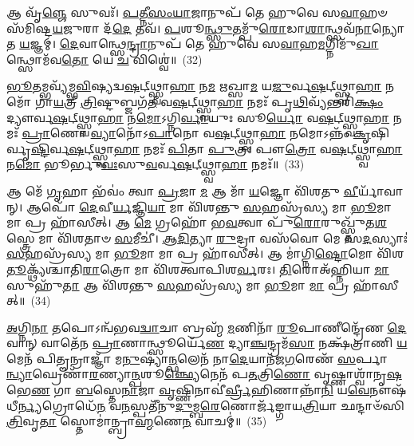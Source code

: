 𑌆 𑌵𑍃᳴\-\ul{𑌞𑍍𑌜𑍇} 𑌸𑍁𑌵𑌃᳴। \ul{𑌪}\-\-\ul{𑌤𑍍𑌨𑍀}\-\-\ul{𑌸𑌂}\-\-\ul{𑌯𑌾}\-𑌜𑌾𑌨𑍁𑌪᳴ 𑌤𑍇 𑌹𑍁𑌵𑍇 𑌸\-\ul{𑌵𑌾}\-𑌹𑍞 𑌸᳴𑌮𑌿𑌷𑍍𑌟\-\ul{𑌯}\-𑌜𑍁𑌰𑌾 𑌦᳴\-\ul{𑌦𑍇} 𑌤𑌵᳴। \ul{𑌪}\-𑌶𑍂\-\ul{𑌨𑍍𑌥𑍍𑌸𑍁}\-𑌤𑌮𑍍𑌪𑍁᳴\-\ul{𑌰𑍋}\-𑌡𑌾\-\ul{𑌶𑌾}\-𑌨𑍍𑌥𑍍𑌸𑌵᳴\-\ul{𑌨𑌾}\-𑌨𑍍𑌯𑍋𑌤 \ul{𑌯}\-𑌜𑍍𑌞𑌮𑍍। \ul{𑌦𑍇}\-𑌵𑌾𑌨𑍍𑌥𑍍𑌸𑍇\-\ul{𑌨𑍍𑌦𑍍𑌰𑌾}\-𑌨𑍁𑌪᳴ 𑌤𑍇 𑌹𑍁𑌵𑍇 𑌸\-\ul{𑌵𑌾}\-𑌹\-\ul{𑌮}\-𑌗𑍍𑌨𑌿𑌮𑍁᳴\-\ul{𑌖𑌾}\-𑌨𑍍𑌥𑍍𑌸𑍋𑌮᳴𑌵\-\ul{𑌤𑍋} 𑌯𑍇 \ul{𑌚} 𑌵𑌿𑌶𑍍𑌵𑍇॑॥~(32)

{\anuvakamend[{𑌉\-\ul{𑌪} 𑌗𑍍𑌰\-\ul{𑌹}\-𑌮𑌿𑌡𑌾᳴\-\ul{𑌮𑌾}\-𑌶𑌿\-\ul{𑌷𑍋} 𑌦𑍍𑌵𑌾𑌤𑍍𑌰𑌿𑍞᳴𑌶𑌚𑍍𑌚}]}%

\-\ul{𑌭𑍂}\-𑌤𑌮𑍍𑌭𑌵𑍍𑌯᳴𑌮𑍍𑌭\-\ul{𑌵𑌿}\-𑌷𑍍𑌯𑌦𑍍𑌵\-\ul{𑌷}\-𑌟𑍍𑌥𑍍𑌸𑍍𑌵𑌾\-\ul{𑌹𑌾} 𑌨\-\ul{𑌮} 𑌋𑌖𑍍𑌸𑌾\-\ul{𑌮} 𑌯\-\ul{𑌜𑍁}\-𑌰𑍍𑌵\-\ul{𑌷}\-𑌟𑍍𑌥𑍍𑌸𑍍𑌵𑌾\-\ul{𑌹𑌾} 𑌨𑌮𑍋᳴ 𑌗𑌾\-\ul{𑌯}\-𑌤𑍍𑌰𑍀 \ul{𑌤𑍍𑌰𑌿}\-𑌷𑍍𑌟𑍁𑌬𑍍𑌜𑌗᳴\-\ul{𑌤𑍀} 𑌵\-\ul{𑌷}\-𑌟𑍍𑌥𑍍𑌸𑍍𑌵𑌾\-\ul{𑌹𑌾} 𑌨𑌮𑌃᳴ 𑌪𑍃\-\ul{𑌥𑌿}\-𑌵𑍍𑌯᳴𑌨𑍍𑌤𑌰𑌿᳴\-\ul{𑌕𑍍𑌷𑌂} 𑌦𑍍𑌯𑍗𑌰𑍍𑌵\-\ul{𑌷}\-𑌟𑍍𑌥𑍍𑌸𑍍𑌵𑌾\-\ul{𑌹𑌾} 𑌨\-\ul{𑌮𑍋}\-\-𑌽𑌗𑍍𑌨𑌿\-\ul{𑌰𑍍𑌵𑌾}\-𑌯𑍁𑌃 𑌸𑍂\-\ul{𑌰𑍍𑌯𑍋} 𑌵\-\ul{𑌷}\-𑌟𑍍𑌥𑍍𑌸𑍍𑌵𑌾\-\ul{𑌹𑌾} 𑌨𑌮𑌃᳴ \ul{𑌪𑍍𑌰𑌾}\-𑌣𑍋 \ul{𑌵𑍍𑌯𑌾}\-𑌨𑍋᳴\-𑌽\-\ul{𑌪𑌾}\-𑌨𑍋 𑌵\-\ul{𑌷}\-𑌟𑍍𑌥𑍍𑌸𑍍𑌵𑌾\-\ul{𑌹𑌾} 𑌨𑌮𑍋\-𑌽𑌨𑍍𑌨𑌂᳴ \ul{𑌕𑍃}\-𑌷𑌿𑌰𑍍𑌵𑍃\-\ul{𑌷𑍍𑌟𑌿}\-𑌰𑍍𑌵\-\ul{𑌷}\-𑌟𑍍𑌥𑍍𑌸𑍍𑌵𑌾\-\ul{𑌹𑌾} 𑌨𑌮𑌃᳴ \ul{𑌪𑌿}\-𑌤𑌾 \ul{𑌪𑍁}\-𑌤𑍍𑌰𑌃 𑌪𑍗\-\ul{𑌤𑍍𑌰𑍋} 𑌵\-\ul{𑌷}\-𑌟𑍍𑌥𑍍𑌸𑍍𑌵𑌾\-\ul{𑌹𑌾} 𑌨\-\ul{𑌮𑍋} 𑌭𑍂𑌰𑍍𑌭𑍁\-\ul{𑌵𑌃}\-𑌸𑍁\-\ul{𑌵}\-𑌰𑍍𑌵\-\ul{𑌷}\-𑌟𑍍𑌥𑍍𑌸𑍍𑌵𑌾\-\ul{𑌹𑌾} 𑌨𑌮𑌃᳴॥~(33)

{\anuvakamend[{𑌭𑍁𑌵᳴\-\ul{𑌶𑍍𑌚}\-𑌤𑍍𑌵𑌾𑌰𑌿᳴ 𑌚}]}%

𑌆 𑌮𑍇᳴ \ul{𑌗𑍃}\-𑌹𑌾 𑌭᳴𑌵𑌂॑ 𑌤𑍍𑌵𑌾 \ul{𑌪𑍍𑌰}\-𑌜𑌾 \ul{𑌮} 𑌆 𑌮𑌾᳴ \ul{𑌯}\-𑌜𑍍𑌞𑍋 𑌵𑌿᳴𑌶𑌤𑍁 \ul{𑌵𑍀}\-𑌰𑍍𑌯𑌾᳴𑌵𑌾𑌨𑍍। 𑌆𑌪𑍋᳴ \ul{𑌦𑍇}\-𑌵𑍀\-\ul{𑌰𑍍𑌯}\-𑌜𑍍𑌞𑌿\-\ul{𑌯𑌾} 𑌮𑌾 𑌵𑌿᳴𑌶𑌨𑍍𑌤𑍁 \ul{𑌸}\-𑌹𑌸𑍍𑌰᳴𑌸𑍍𑌯 𑌮𑌾 \ul{𑌭𑍂}\-𑌮𑌾 𑌮𑌾 𑌪𑍍𑌰 𑌹𑌾᳴𑌸𑍀𑌤𑍍। 𑌆 \ul{𑌮𑍇} 𑌗𑍍𑌰𑌹𑍋᳴ 𑌭\-\ul{𑌵}\-𑌤𑍍𑌵𑌾 𑌪𑍁᳴\-\ul{𑌰𑍋}\-𑌰𑍁𑌖𑍍𑌸𑍍𑌤𑍁᳴𑌤\-\ul{𑌶}\-𑌸𑍍𑌤𑍍𑌰𑍇 𑌮𑌾 𑌵𑌿᳴𑌶𑌤𑌾𑍞 \ul{𑌸}\-𑌮𑍀𑌚𑍀॑। \ul{𑌆}\-\-\ul{𑌦𑌿}\-𑌤𑍍𑌯𑌾 \ul{𑌰𑍁}\-𑌦𑍍𑌰𑌾 𑌵𑌸᳴𑌵𑍋 𑌮𑍇 𑌸\-\ul{𑌦}\-𑌸𑍍𑌯𑌾𑌃॑ \ul{𑌸}\-𑌹𑌸𑍍𑌰᳴𑌸𑍍𑌯 𑌮𑌾 \ul{𑌭𑍂}\-𑌮𑌾 𑌮𑌾 𑌪𑍍𑌰 𑌹𑌾᳴𑌸𑍀𑌤𑍍। 𑌆 𑌮𑌾॑𑌗𑍍𑌨𑌿\-\ul{𑌷𑍍𑌟𑍋}\-𑌮𑍋 𑌵𑌿᳴𑌶\-\ul{𑌤𑍂}\-𑌕𑍍𑌥𑍍𑌯᳴𑌶𑍍𑌚𑌾𑌤𑌿\-\ul{𑌰𑌾}\-𑌤𑍍𑌰𑍋 𑌮𑌾 𑌵𑌿᳴𑌶𑌤𑍍𑌵𑌾𑌪𑌿𑌶\-\ul{𑌰𑍍𑌵}\-𑌰𑌃। \ul{𑌤𑌿}\-𑌰𑍋𑌅᳴𑌹𑍍𑌨𑌿𑌯𑌾 \ul{𑌮𑌾} 𑌸𑍁𑌹𑍁᳴\-\ul{𑌤𑌾} 𑌆 𑌵𑌿᳴𑌶𑌨𑍍𑌤𑍁 \ul{𑌸}\-𑌹𑌸𑍍𑌰᳴𑌸𑍍𑌯 𑌮𑌾 \ul{𑌭𑍂}\-𑌮𑌾 \ul{𑌮𑌾} 𑌪𑍍𑌰 𑌹𑌾᳴𑌸𑍀𑌤𑍍॥~(34)

{\anuvakamend[{\-\ul{𑌅}\-\-\ul{𑌗𑍍𑌨𑌿}\-\-\ul{𑌷𑍍𑌟𑍋}\-𑌮𑍋 𑌵𑌿᳴𑌶\-\ul{𑌤𑍍𑌵}\-𑌷𑍍𑌟𑌾𑌦᳴𑌶 𑌚}]}%

\-\ul{𑌅}\-𑌗𑍍𑌨𑌿\-\ul{𑌨𑌾} 𑌤𑌪𑍋\-𑌽𑌨𑍍𑌵᳴𑌭𑌵\-\ul{𑌦𑍍𑌵𑌾}\-𑌚𑌾 𑌬𑍍𑌰𑌹𑍍𑌮᳴ \ul{𑌮}\-𑌣𑌿𑌨𑌾᳴ \ul{𑌰𑍂}\-𑌪𑌾𑌣𑍀𑌨𑍍𑌦𑍍𑌰𑍇᳴𑌣 \ul{𑌦𑍇}\-𑌵𑌾𑌨𑍍 𑌵𑌾𑌤𑍇᳴𑌨 \ul{𑌪𑍍𑌰𑌾}\-𑌣𑌾𑌨𑍍𑌥𑍍𑌸𑍂𑌰𑍍𑌯𑍇᳴\-\ul{𑌣} 𑌦𑍍𑌯𑌾\-\ul{𑌞𑍍𑌚}\-𑌨𑍍𑌦𑍍𑌰𑌮᳴\-\ul{𑌸𑌾} 𑌨𑌕𑍍𑌷᳴𑌤𑍍𑌰𑌾𑌣𑌿 \ul{𑌯}\-𑌮𑍇𑌨᳴ 𑌪𑌿𑌤𑍄𑌨𑍍𑌰𑌾𑌜𑍍𑌞𑌾᳴ 𑌮\-\ul{𑌨𑍁}\-𑌷𑍍𑌯𑌾॑\-\ul{𑌨𑍍𑌫}\-𑌲𑍇𑌨᳴ 𑌨𑌾\-\ul{𑌦𑍇}\-𑌯𑌾𑌨᳴𑌜\-\ul{𑌗}\-𑌰𑍇𑌣᳴ \ul{𑌸}\-𑌰𑍍𑌪𑌾\-\ul{𑌨𑍍𑌵𑍍𑌯𑌾}\-𑌘𑍍𑌰𑍇𑌣𑌾᳴\-\ul{𑌰}\-𑌣𑍍𑌯𑌾\-\ul{𑌨𑍍𑌪}\-𑌶𑍂\-\ul{𑌞𑍍𑌛𑍍𑌯𑍇}\-𑌨𑍇𑌨᳴ 𑌪\-\ul{𑌤}\-𑌤𑍍𑌰𑌿\-\ul{𑌣𑍋} 𑌵𑍃𑌷𑍍𑌣𑌾𑌶𑍍𑌵𑌾᳴𑌨𑍃\-\ul{𑌷}\-𑌭𑍇\-\ul{𑌣} 𑌗𑌾 \ul{𑌬}\-𑌸𑍍𑌤𑍇\-\ul{𑌨𑌾}\-𑌜𑌾 \ul{𑌵𑍃}\-𑌷𑍍𑌣𑌿𑌨𑌾𑌵𑍀॑\-\ul{𑌰𑍍𑌵𑍍𑌰𑍀}\-𑌹𑌿𑌣𑌾𑌨𑍍𑌨𑌾᳴\-\ul{𑌨𑌿} 𑌯\-\ul{𑌵𑍇}\-𑌨𑍗𑌷᳴𑌧𑍀\-\ul{𑌰𑍍𑌨𑍍𑌯}\-𑌗𑍍𑌰𑍋𑌧𑍇᳴\-\ul{𑌨} 𑌵\-\ul{𑌨}\-𑌸𑍍𑌪𑌤𑍀᳴𑌨𑍁\-\ul{𑌦𑍁}\-𑌮𑍍𑌬\-\ul{𑌰𑍇}\-𑌣𑍋𑌰𑍍𑌜᳴𑌙𑍍𑌗𑌾𑌯\-\ul{𑌤𑍍𑌰𑌿}\-𑌯𑌾 𑌛𑌨𑍍𑌦𑌾𑍞᳴𑌸𑌿 \ul{𑌤𑍍𑌰𑌿}\-𑌵𑍃\-\ul{𑌤𑌾} 𑌸𑍍𑌤𑍋𑌮𑌾॑𑌨𑍍𑌬𑍍𑌰𑌾\-\ul{𑌹𑍍𑌮}\-𑌣𑍇\-\ul{𑌨} 𑌵𑌾𑌚𑌮𑍍॑॥~(35)

